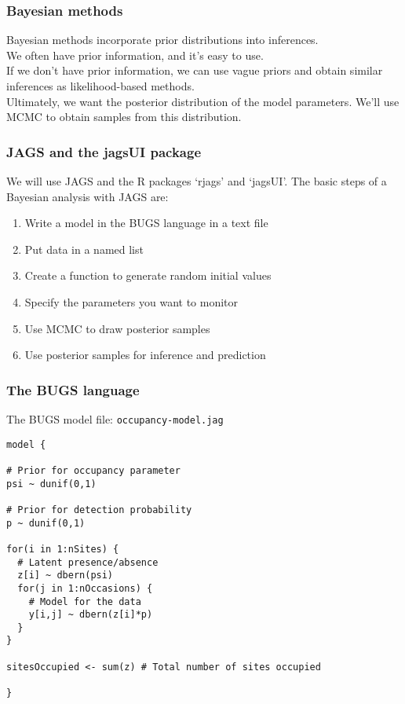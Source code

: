 \documentclass[color=usenames,dvipsnames]{beamer}\usepackage[]{graphicx}\usepackage[]{color}
\makeatletter
\newenvironment{kframe}{%
 \def\at@end@of@kframe{}%
 \ifinner\ifhmode%
  \def\at@end@of@kframe{\end{minipage}}%
  \begin{minipage}{\columnwidth}%
 \fi\fi%
 \def\FrameCommand##1{\hskip\@totalleftmargin \hskip-\fboxsep
 \colorbox{shadecolor}{##1}\hskip-\fboxsep
     \hskip-\linewidth \hskip-\@totalleftmargin \hskip\columnwidth}%
 \MakeFramed {\advance\hsize-\width
   \@totalleftmargin\z@ \linewidth\hsize
   \@setminipage}}%
 {\par\unskip\endMakeFramed%
 \at@end@of@kframe}
\newenvironment{knitrout}{}{} %
\makeatother
\begin{document}
\begin{frame}
  \frametitle{Bayesian methods}
  Bayesian methods incorporate prior distributions into inferences. \\
  \pause
  \vfill
  We often have prior information, and it's easy to use. \\
  \pause
  \vfill
  If we don't have prior information, we can use vague priors and
  obtain similar inferences as likelihood-based methods. \\
  \pause
  \vfill
  Ultimately, we want the posterior distribution of the model
  parameters. We'll use MCMC to obtain samples from this
  distribution. 
\end{frame}




\begin{frame}
  \frametitle{JAGS and the jagsUI package}
  We will use JAGS and the R packages `rjags' and `jagsUI'.
  \vfill
  The basic steps of a Bayesian analysis with JAGS are:
  \begin{enumerate}%
    \item Write a model in the BUGS language in a text file
    \item Put data in a named list
    \item Create a function to generate random initial values
    \item Specify the parameters you want to monitor
    \item Use MCMC to draw posterior samples
    \item Use posterior samples for inference and prediction
  \end{enumerate}
\end{frame}



\begin{frame}[fragile]
  \frametitle{The BUGS language}
  The BUGS model file: {\tt occupancy-model.jag}
\begin{knitrout}\scriptsize
{}\color{fgcolor}\begin{kframe}
\begin{verbatim}
model {

# Prior for occupancy parameter
psi ~ dunif(0,1)

# Prior for detection probability
p ~ dunif(0,1)

for(i in 1:nSites) {
  # Latent presence/absence
  z[i] ~ dbern(psi)   
  for(j in 1:nOccasions) {
    # Model for the data
    y[i,j] ~ dbern(z[i]*p)
  }
}

sitesOccupied <- sum(z) # Total number of sites occupied

}
\end{verbatim}
\end{kframe}
\end{knitrout}
\end{frame}
\end{document}
